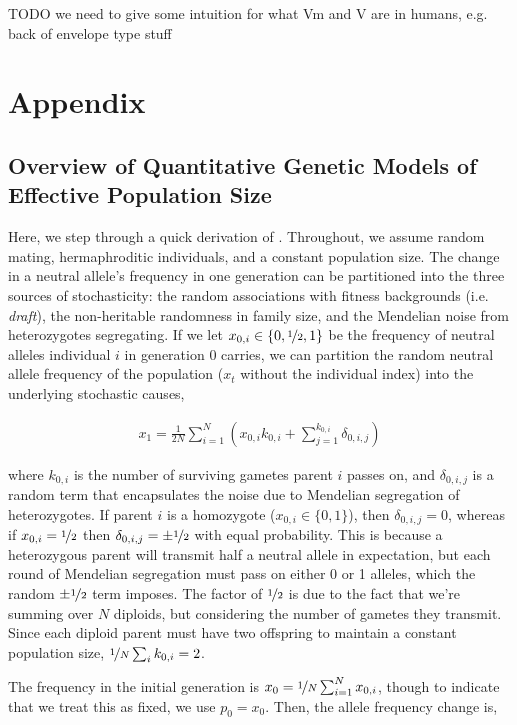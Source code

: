 \documentclass[11pt]{article}
\begin{document}
TODO we need to give some intuition for what Vm and V are in humans, e.g. back of envelope type stuff

\section*{Appendix}

\subsection*{Overview of Quantitative Genetic Models of Effective Population Size}

Here, we step through a quick derivation of \textcite{Santiago1995-hx}.
Throughout, we assume random mating, hermaphroditic individuals, and a constant
population size. The change in a neutral allele's frequency in one generation
can be partitioned into the three sources of stochasticity: the random
associations with fitness backgrounds (i.e. \emph{draft}), the non-heritable
randomness in family size, and the Mendelian noise from heterozygotes
segregating. If we let $x_{0,i} \in \{0, \nicefrac{1}{2}, 1\}$ be the frequency
of neutral alleles individual $i$ in generation 0 carries, we can partition the
random neutral allele frequency of the population ($x_t$ without the individual
index) into the underlying stochastic causes,

\begin{align}
  x_1 = \frac{1}{2N} \sum_{i=1}^N \left( x_{0,i}k_{0,i} + \sum_{j=1}^{k_{0,i}} \delta_{0,i,j} \right)
\end{align}

where $k_{0,i}$ is the number of surviving gametes parent $i$ passes on, and
$\delta_{0,i,j}$ is a random term that encapsulates the noise due to Mendelian
segregation of heterozygotes. If parent $i$ is a homozygote ($x_{0,i} \in \{0,
1\}$), then $\delta_{0,i,j} = 0$, whereas if $x_{0,i} = \nicefrac{1}{2}$ then
$\delta_{0,i,j} = \pm \nicefrac{1}{2}$ with equal probability. This is because
a heterozygous parent will transmit half a neutral allele in expectation, but
each round of Mendelian segregation must pass on either 0 or 1 alleles, which
the random $\pm \nicefrac{1}{2}$ term imposes. The factor of $\nicefrac{1}{2}$
is due to the fact that we're summing over $N$ diploids, but considering the
number of gametes they transmit. Since each diploid parent must have two
offspring to maintain a constant population size, $\nicefrac{1}{N} \sum_i
k_{0,i} = 2$. 

The frequency in the initial generation is $x_0 = \nicefrac{1}{N} \sum_{i=1}^N
x_{0,i}$, though to indicate that we treat this as fixed, we use $p_0 = x_0$.
Then, the allele frequency change is,
\end{document}
